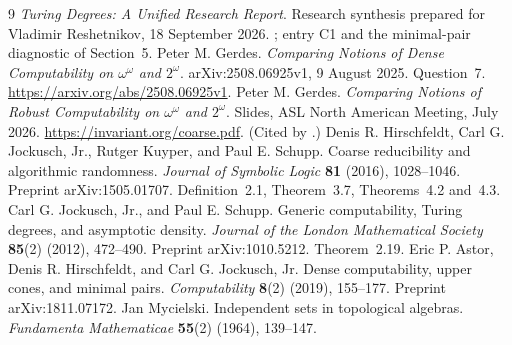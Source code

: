 \documentclass[11pt,letterpaper]{article}
\theoremstyle{definition}
\numberwithin{equation}{section}
\newcommand{\rep}[1]{\leavevmode{\sffamily\small\color{Steel}R#1}}
\begin{document}
\begingroup\raggedright\small
\begin{thebibliography}{9}
\emph{Turing Degrees: A Unified Research Report}. Research synthesis prepared for Vladimir Reshetnikov, 18 September 2026. ; entry C1 and the minimal-pair diagnostic of Section~5.
Peter M. Gerdes. \emph{Comparing Notions of Dense Computability on $\omega^\omega$ and $2^\omega$}. arXiv:2508.06925v1, 9 August 2025. Question~7. \url{https://arxiv.org/abs/2508.06925v1}.
Peter M. Gerdes. \emph{Comparing Notions of Robust Computability on $\omega^\omega$ and $2^\omega$}. Slides, ASL North American Meeting, July 2026. \url{https://invariant.org/coarse.pdf}. (Cited by \rep5.)
Denis R. Hirschfeldt, Carl G. Jockusch, Jr., Rutger Kuyper, and Paul E. Schupp. Coarse reducibility and algorithmic randomness. \emph{Journal of Symbolic Logic} \textbf{81} (2016), 1028--1046. Preprint arXiv:1505.01707. Definition~2.1, Theorem~3.7, Theorems~4.2 and~4.3.
Carl G. Jockusch, Jr., and Paul E. Schupp. Generic computability, Turing degrees, and asymptotic density. \emph{Journal of the London Mathematical Society} \textbf{85}(2) (2012), 472--490. Preprint arXiv:1010.5212. Theorem~2.19.
Eric P. Astor, Denis R. Hirschfeldt, and Carl G. Jockusch, Jr. Dense computability, upper cones, and minimal pairs. \emph{Computability} \textbf{8}(2) (2019), 155--177. Preprint arXiv:1811.07172.
Jan Mycielski. Independent sets in topological algebras. \emph{Fundamenta Mathematicae} \textbf{55}(2) (1964), 139--147.
\end{thebibliography}
\endgroup
\end{document}
